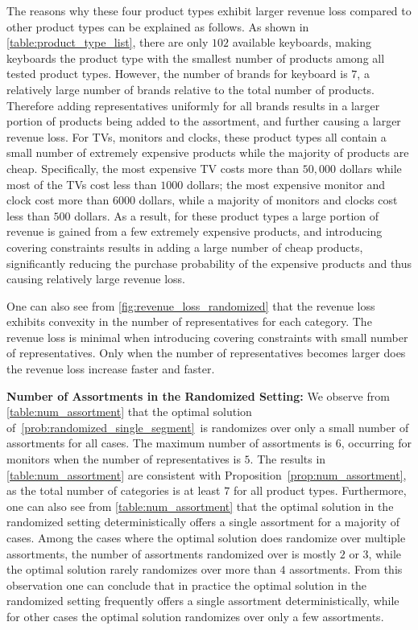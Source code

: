 \documentclass[msom,non-blindrev]{informs3} %
\theoremstyle{definition}
\begin{document}
The reasons why these four product types exhibit larger revenue loss compared to other product types can be explained as follows. As shown in \cref{table:product_type_list}, there are only $102$ available keyboards, making keyboards the product type with the smallest number of products among all tested product types. However, the number of brands for keyboard is $7$, a relatively large number of brands relative to the total number of products. Therefore adding representatives uniformly for all brands results in a larger portion of products being added to the assortment, and further causing a larger revenue loss. For TVs, monitors and clocks, these product types all contain a small number of extremely expensive products while the majority of products are cheap. Specifically, the most expensive TV costs more than $50,000$ dollars while most of the TVs cost less than $1000$ dollars; the most expensive monitor and clock cost more than $6000$ dollars, while a majority of monitors and clocks cost less than $500$ dollars. As a result, for these product types a large portion of revenue is gained from a few extremely expensive products, and introducing covering constraints results in adding a large number of cheap products, significantly reducing the purchase probability of the expensive products and thus causing relatively large revenue loss.

One can also see from \cref{fig:revenue_loss_randomized} that the revenue loss exhibits convexity in the number of representatives for each category. The revenue loss is minimal when introducing covering constraints with small number of representatives. Only when the number of representatives becomes larger does the revenue loss increase faster and faster.

\noindent\textbf{Number of Assortments in the Randomized Setting:} We observe from \cref{table:num_assortment} that the optimal solution of~\eqref{prob:randomized_single_segment}~is randomizes over only a small number of assortments for all cases. The maximum number of assortments is $6$, occurring for monitors when the number of representatives is $5$. The results in \cref{table:num_assortment} are consistent with Proposition~\ref{prop:num_assortment}, as the total number of categories is at least $7$ for all product types. Furthermore, one can also see from \cref{table:num_assortment} that the optimal solution in the randomized setting deterministically offers a single assortment for a majority of cases. Among the cases where the optimal solution does randomize over multiple assortments, the number of assortments randomized over is mostly $2$ or $3$, while the optimal solution rarely randomizes over more than $4$ assortments. From this observation one can conclude that in practice the optimal solution in the randomized setting frequently offers a single assortment deterministically, while for other cases the optimal solution randomizes over only a few assortments.
\end{document}
